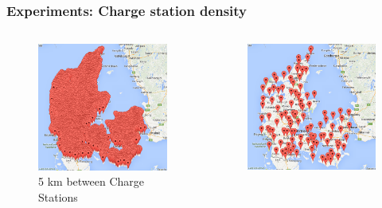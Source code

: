 \begin{frame}
  \frametitle{Experiments: Charge station density}
  \begin{columns}[c]
  	\begin{center}
  		\begin{figure}
	  	\includegraphics[scale=0.3]{images/density5km}
	  	\caption{5 km between Charge Stations}
	  	\end{figure} 
  	\end{center}
   \begin{center}
   		\begin{figure}
	  	\includegraphics[scale=0.3]{images/density30km} 

\end{figure}
\end{center}
\end{columns}
\end{frame}
